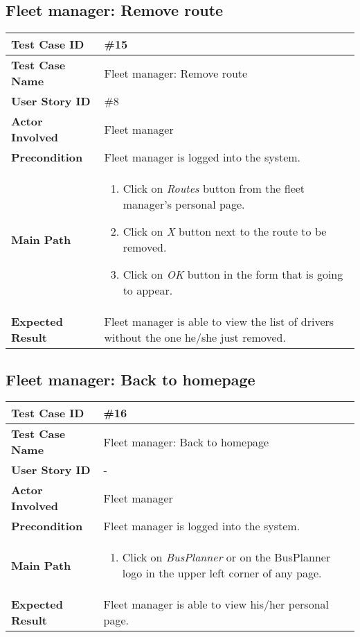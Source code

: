 \subsection{Fleet manager: Remove route}
\begin{center}
	\begin{tabular} { | m{3.5cm} | m{9.5cm} | }
		\hline
		\textbf{Test Case ID} & \#15\\
		\hline
		\textbf{Test Case Name} & Fleet manager: Remove route\\
		\hline
		\textbf{User Story ID} & \#8 \\
		\hline
		\textbf{Actor Involved} & Fleet manager\\
		\hline
		\textbf{Precondition} & Fleet manager is logged into the system.\\
		\hline
		\textbf{Main Path} & 
		\begin{enumerate}
			\item Click on \textit{Routes} button from the fleet manager's personal page.
			\item Click on \textit{X} button next to the route to be removed.
			\item Click on \textit{OK} button in the form that is going to appear.
		\end{enumerate}\\
		\hline
		\textbf{Expected Result} & Fleet manager is able to view the list of drivers without the one he/she just removed.\\
		\hline
	\end{tabular}
\end{center}

\subsection{Fleet manager: Back to homepage}
\begin{center}
	\begin{tabular} { | m{3.5cm} | m{9.5cm} | }
		\hline
		\textbf{Test Case ID} & \#16\\
		\hline
		\textbf{Test Case Name} & Fleet manager: Back to homepage\\
		\hline
		\textbf{User Story ID} & - \\
		\hline
		\textbf{Actor Involved} & Fleet manager\\
		\hline
		\textbf{Precondition} & Fleet manager is logged into the system.\\
		\hline
		\textbf{Main Path} & 
		\begin{enumerate}
			\item Click on \textit{BusPlanner} or on the BusPlanner logo in the upper left corner of any page.
		\end{enumerate}\\
		\hline
		\textbf{Expected Result} & Fleet manager is able to view his/her personal page.\\
		\hline
	\end{tabular}
\end{center}
\newpage
